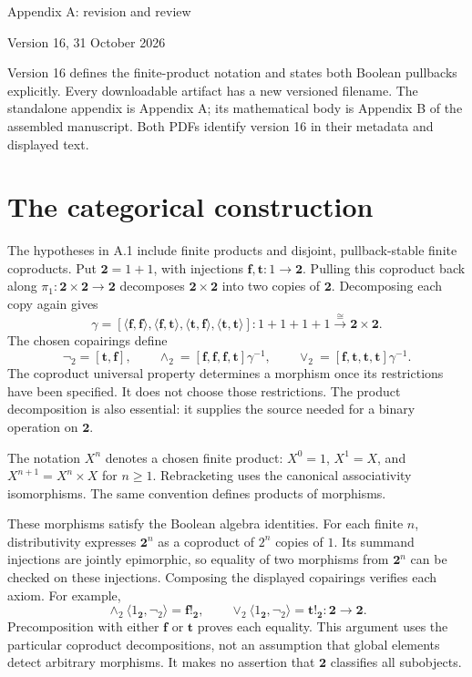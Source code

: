 \documentclass[10pt]{article}
\newcommand{\Two}{\mathbf2}
\begin{document}
{\LARGE Appendix A: revision and review}\par
{\large Version 16, 31 October 2026}\par

Version 16 defines the finite-product notation and states both Boolean
pullbacks explicitly. Every downloadable artifact has a new versioned filename. The standalone appendix is
Appendix A; its mathematical body is Appendix B of the assembled manuscript.
Both PDFs identify version 16 in their metadata and displayed text.

\section*{The categorical construction}
The hypotheses in A.1 include finite products and disjoint, pullback-stable
finite coproducts. Put $\Two=1+1$, with injections
$\mathbf f,\mathbf t:1\to\Two$. Pulling this coproduct back along
$\pi_1:\Two\times\Two\to\Two$ decomposes $\Two\times\Two$ into two copies of
$\Two$. Decomposing each copy again gives
\[
\gamma=[\langle\mathbf f,\mathbf f\rangle,
\langle\mathbf f,\mathbf t\rangle,
\langle\mathbf t,\mathbf f\rangle,
\langle\mathbf t,\mathbf t\rangle]:
1+1+1+1\xrightarrow{\cong}\Two\times\Two.
\]
The chosen copairings define
\[
\neg_2=[\mathbf t,\mathbf f],\qquad
\wedge_2=[\mathbf f,\mathbf f,\mathbf f,\mathbf t]\gamma^{-1},
\qquad
\vee_2=[\mathbf f,\mathbf t,\mathbf t,\mathbf t]\gamma^{-1}.
\]
The coproduct universal property determines a morphism once its restrictions
have been specified. It does not choose those restrictions. The product
decomposition is also essential: it supplies the source needed for a binary
operation on $\Two$.

The notation $X^n$ denotes a chosen finite product: $X^0=1$, $X^1=X$,
and $X^{n+1}=X^n\times X$ for $n\geq1$. Rebracketing uses the canonical
associativity isomorphisms. The same convention defines products of morphisms.

These morphisms satisfy the Boolean algebra identities. For each finite $n$,
distributivity expresses $\Two^n$ as a coproduct of $2^n$ copies of $1$.
Its summand injections are jointly epimorphic, so equality of two morphisms
from $\Two^n$ can be checked on these injections. Composing the displayed
copairings verifies each axiom. For example,
\[
\wedge_2\langle1_{\Two},\neg_2\rangle=\mathbf f!_{\Two},
\qquad
\vee_2\langle1_{\Two},\neg_2\rangle=\mathbf t!_{\Two}:
\Two\to\Two.
\]
Precomposition with either $\mathbf f$ or $\mathbf t$ proves each equality.
This argument uses the particular coproduct decompositions, not an assumption
that global elements detect arbitrary morphisms. It makes no assertion that
$\Two$ classifies all subobjects.
\end{document}
